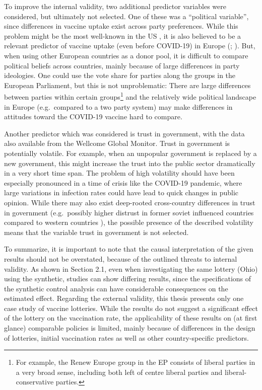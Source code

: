 \documentclass{scrbook}
\begin{document}
To improve the internal validity, two additional predictor variables
were considered, but ultimately not selected. One of these was a
``political variable'', since differences in vaccine uptake exist across
party preferences. While this problem might be the most well-known in
the US \parencite{ruiz_predictors_2021}, it is also believed to be a
relevant predictor of vaccine uptake (even before COVID-19) in Europe
(\cite{schernhammer_correlates_2022}; \cite{kennedy_populist_2019}).
But, when using other European countries as a donor pool, it is
difficult to compare political beliefs across countries, mainly because
of large differences in party ideologies. One could use the vote share
for parties along the groups in the European Parliament, but this is not
unproblematic: There are large differences between parties within
certain
groups\footnote{For example, the Renew Europe group in the EP consists of liberal parties in a very broad sense, including both left of centre liberal parties and liberal-conservative parties.}
and the relatively wide political landscape in Europe (e.g.~compared to
a two party system) may make differences in attitudes toward the
COVID-19 vaccine hard to compare.

Another predictor which was considered is trust in government, with the
data also available from the Wellcome Global Monitor. Trust in
government is potentially volatile. For example, when an unpopular
government is replaced by a new government, this might increase the
trust into the public sector dramatically in a very short time span. The
problem of high volatility should have been especially pronounced in a
time of crisis like the COVID-19 pandemic, where large variations in
infection rates could have lead to quick changes in public opinion.
While there may also exist deep-rooted cross-country differences in
trust in government (e.g.~possibly higher distrust in former soviet
influenced countries compared to western countries
\parencite{costa-font_institutional_2023}), the possible presence of the
described volatility means that the variable trust in government is not
selected.

To summarize, it is important to note that the causal interpretation of
the given results should not be overstated, because of the outlined
threats to internal validity. As shown in Section 2.1, even when
investigating the same lottery (Ohio) using the synthetic, studies can
show differing results, since the specifications of the synthetic
control analysis can have considerable consequences on the estimated
effect. Regarding the external validity, this thesis presents only one
case study of vaccine lotteries. While the results do not suggest a
significant effect of the lottery on the vaccination rate, the
applicability of these results on (at first glance) comparable policies
is limited, mainly because of differences in the design of lotteries,
initial vaccination rates as well as other country-specific predictors.
\end{document}

